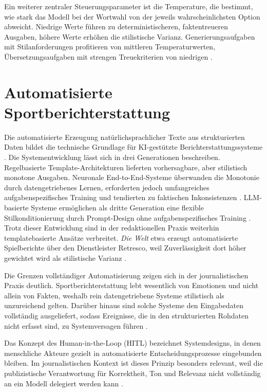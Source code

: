 Ein weiterer zentraler Steuerungsparameter ist die Temperature, die bestimmt, wie stark das Modell bei der Wortwahl von der jeweils wahrscheinlichsten Option abweicht. Niedrige Werte führen zu deterministischeren, faktentreueren Ausgaben, höhere Werte erhöhen die stilistische Varianz. Generierungsaufgaben mit Stilanforderungen profitieren von mittleren Temperaturwerten, Übersetzungsaufgaben mit strengen Treuekriterien von niedrigen \cite{brown2020, openai2023}.


\section{Automatisierte Sportberichterstattung}\label{automatisierte-sportberichterstattung}

Die automatisierte Erzeugung natürlichsprachlicher Texte aus strukturierten Daten bildet die technische Grundlage für KI-gestützte Berichterstattungssysteme \cite{puduppully2021}. Die Systementwicklung lässt sich in drei Generationen beschreiben. Regelbasierte Template-Architekturen lieferten vorhersagbare, aber stilistisch monotone Ausgaben. Neuronale End-to-End-Systeme überwanden die Monotonie durch datengetriebenes Lernen, erforderten jedoch umfangreiches aufgabenspezifisches Training und tendierten zu faktischen Inkonsistenzen \cite{puduppully2021, beils2023}. LLM-basierte Systeme ermöglichen als dritte Generation eine flexible Stilkonditionierung durch Prompt-Design ohne aufgabenspezifisches Training \cite{openai2023}. Trotz dieser Entwicklung sind in der redaktionellen Praxis weiterhin templatebasierte Ansätze verbreitet. \textit{Die Welt} etwa erzeugt automatisierte Spielberichte über den Dienstleister Retresco, weil Zuverlässigkeit dort höher gewichtet wird als stilistische Varianz \cite{beils2023}.

Die Grenzen vollständiger Automatisierung zeigen sich in der journalistischen Praxis deutlich. Sportberichterstattung lebt wesentlich von Emotionen und nicht allein von Fakten, weshalb rein datengetriebene Systeme stilistisch als unzureichend gelten. Darüber hinaus sind solche Systeme den Eingabedaten vollständig ausgeliefert, sodass Ereignisse, die in den strukturierten Rohdaten nicht erfasst sind, zu Systemversagen führen \cite{beils2023}.

Das Konzept des Human-in-the-Loop (HITL) bezeichnet Systemdesigns, in denen menschliche Akteure gezielt in automatisierte Entscheidungsprozesse eingebunden bleiben. Im journalistischen Kontext ist dieses Prinzip besonders relevant, weil die publizistische Verantwortung für Korrektheit, Ton und Relevanz nicht vollständig an ein Modell delegiert werden kann \cite{beils2023}.




